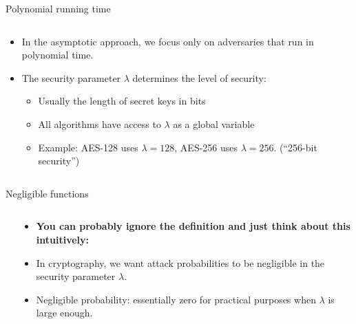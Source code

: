 \documentclass[aspectratio=169, lualatex, handout]{beamer}
\begin{document}
\begin{frame}{Polynomial running time}
	\begin{columns}[c]
		\begin{column}{0.5\textwidth}
			\begin{itemize}[<+->]
				\item In the asymptotic approach, we focus only on adversaries that run in polynomial time.
				\item The security parameter $\lambda$ determines the level of security:
				      \begin{itemize}
					      \item Usually the length of secret keys in bits
					      \item All algorithms have access to $\lambda$ as a global variable
					      \item Example: AES-128 uses $\lambda = 128$, AES-256 uses $\lambda = 256$. (``256-bit security'')
				      \end{itemize}
			\end{itemize}
		\end{column}
		\begin{column}{0.5\textwidth}
		\end{column}
	\end{columns}
\end{frame}

\begin{frame}{Negligible functions}
	\begin{columns}[c]
		\begin{column}{0.5\textwidth}
		\end{column}
		\begin{column}{0.5\textwidth}
			\begin{itemize}[<+->]
				\item \textbf{You can probably ignore the definition and just think about this intuitively:}
				\item In cryptography, we want attack probabilities to be negligible in the security parameter $\lambda$.
				\item Negligible probability: essentially zero for practical purposes when $\lambda$ is large enough.
			\end{itemize}
		\end{column}
	\end{columns}
\end{frame}
\end{document}
